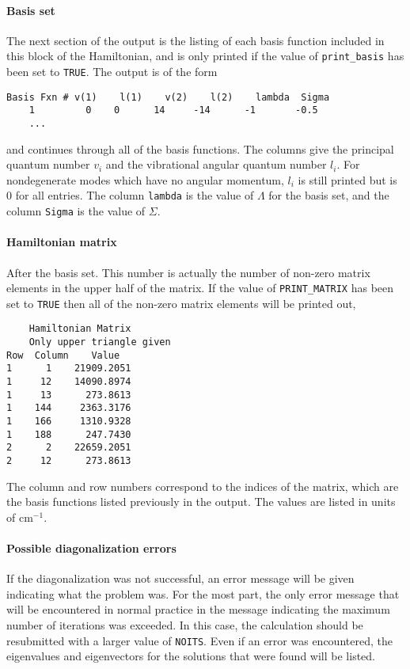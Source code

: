 \documentclass{article}
\newcommand{\wn}{cm$^{-1}$}
\begin{document}
\paragraph{Basis set}
The next section of the output is the listing of each basis function
included in this block of the Hamiltonian, and is only printed if the
value of {\tt print\_basis} has been set to {\tt TRUE}. The output is of
the form
\begin{verbatim}
Basis Fxn #	v(1)	l(1)	v(2)	l(2)	lambda	Sigma	
    1         0	   0	  14	 -14	  -1	   -0.5	
	...	
\end{verbatim}
and continues through all of the basis functions. The columns give the
principal quantum number $v_i$ and the vibrational angular quantum
number $l_i$. For nondegenerate modes which have no angular momentum, $l_i$ is still printed but is 0 for all entries. The column {\tt lambda} is the value of $\Lambda $ for
the basis set, and the column {\tt Sigma} is the value of
$\Sigma $.

\paragraph{Hamiltonian matrix}
After the basis set. This
number is actually the number of non-zero matrix elements in the upper
half of the matrix. If the value of {\tt PRINT\_MATRIX} has been set to
{\tt TRUE} then all of the non-zero matrix elements will be printed
out,
\begin{verbatim}
	Hamiltonian Matrix
	Only upper triangle given
Row  Column    Value
1      1    21909.2051
1     12    14090.8974
1     13      273.8613
1    144     2363.3176
1    166     1310.9328
1    188      247.7430
2      2    22659.2051
2     12      273.8613
\end{verbatim}
The column and row numbers correspond to the indices of the matrix,
which are the basis functions listed previously in the output. The
values are listed in units of \wn .

\paragraph{Possible diagonalization errors}
If the diagonalization was not successful, an error message will be
given indicating what the problem was. For the most part, the only
error message that will be encountered in normal practice in the
message indicating the maximum number of iterations was exceeded. In
this case, the calculation should be resubmitted with a larger value
of {\tt NOITS}. Even if an error was
encountered, the eigenvalues and eigenvectors for the solutions that
were found will be listed.
\end{document}
